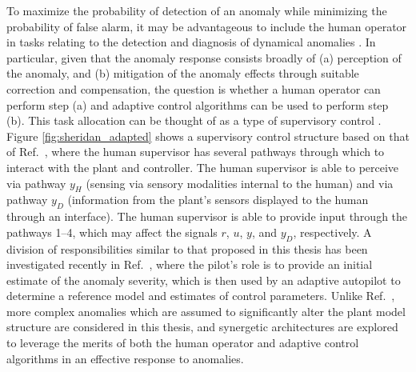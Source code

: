 To maximize the probability of detection of an anomaly while minimizing the probability of false alarm, it may be advantageous to include the human operator in tasks relating to the detection and diagnosis of dynamical anomalies \cite{sheridan2000human}. In particular, given that the anomaly response consists broadly of (a) perception of the anomaly, and (b) mitigation of the anomaly effects through suitable correction and compensation, the question is whether a human operator can perform step (a) and adaptive control algorithms can be used to perform step (b). This task allocation can be thought of as a type of supervisory control \cite{sheridan1976toward, sheridan2011adaptive}. Figure \ref{fig:sheridan_adapted} shows a supervisory control structure based on that of Ref.~\cite{sheridan2011adaptive}, where the human supervisor has several pathways through which to interact with the plant and controller. The human supervisor is able to perceive via pathway $y_H$ (sensing via sensory modalities internal to the human) and via pathway $y_D$ (information from the plant's sensors displayed to the human through an interface). The human supervisor is able to provide input through the pathways 1--4, which may affect the signals $r$, $u$, $y$, and $y_D$, respectively. A division of responsibilities similar to that proposed in this thesis has been investigated recently in Ref.~\cite{farjadian2017bumpless}, where the pilot's role is to provide an initial estimate of the anomaly severity, which is then used by an adaptive autopilot to determine a reference model and estimates of control parameters. Unlike Ref.~\cite{farjadian2017bumpless}, more complex anomalies which are assumed to significantly alter the plant model structure are considered in this thesis, and synergetic architectures are explored to leverage the merits of both the human operator and adaptive control algorithms in an effective response to anomalies.

